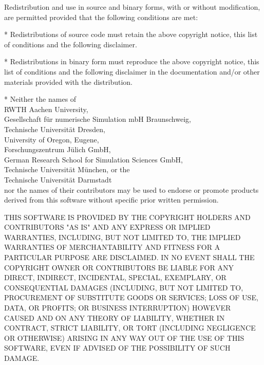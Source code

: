 {\small
Redistribution and use in source and binary forms, with or without
modification, are permitted provided that the following conditions are
met:

* Redistributions of source code must retain the above copyright
  notice, this list of conditions and the following disclaimer.

* Redistributions in binary form must reproduce the above copyright
  notice, this list of conditions and the following disclaimer in the
  documentation and/or other materials provided with the distribution.

* Neither the names of \\ \hspace*{10mm}
   RWTH Aachen University, \\ \hspace*{10mm}
   Gesellschaft f{\"u}r numerische Simulation mbH Braunschweig, \\ \hspace*{10mm}
   Technische Universit{\"a}t Dresden, \\ \hspace*{10mm}
   University of Oregon, Eugene, \\ \hspace*{10mm}
   Forschungszentrum J{\"u}lich GmbH, \\ \hspace*{10mm}
   German Research School for Simulation Sciences GmbH, \\ \hspace*{10mm}
   Technische Universit{\"a}t M{\"u}nchen, or the \\ \hspace*{10mm}
   Technische Universit{\"a}t Darmstadt \\
  nor the names of their contributors may be used to endorse or promote
  products derived from this software without specific prior written
  permission.

THIS SOFTWARE IS PROVIDED BY THE COPYRIGHT HOLDERS AND CONTRIBUTORS
"AS IS" AND ANY EXPRESS OR IMPLIED WARRANTIES, INCLUDING, BUT NOT
LIMITED TO, THE IMPLIED WARRANTIES OF MERCHANTABILITY AND FITNESS FOR
A PARTICULAR PURPOSE ARE DISCLAIMED. IN NO EVENT SHALL THE COPYRIGHT
OWNER OR CONTRIBUTORS BE LIABLE FOR ANY DIRECT, INDIRECT, INCIDENTAL,
SPECIAL, EXEMPLARY, OR CONSEQUENTIAL DAMAGES (INCLUDING, BUT NOT
LIMITED TO, PROCUREMENT OF SUBSTITUTE GOODS OR SERVICES; LOSS OF USE,
DATA, OR PROFITS; OR BUSINESS INTERRUPTION) HOWEVER CAUSED AND ON ANY
THEORY OF LIABILITY, WHETHER IN CONTRACT, STRICT LIABILITY, OR TORT
(INCLUDING NEGLIGENCE OR OTHERWISE) ARISING IN ANY WAY OUT OF THE USE
OF THIS SOFTWARE, EVEN IF ADVISED OF THE POSSIBILITY OF SUCH DAMAGE.
}
